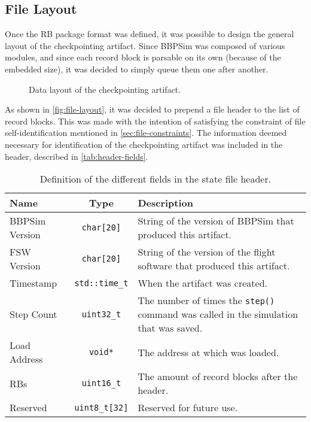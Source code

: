 {\subsection*{File Layout}
Once the RB package format was defined, it was possible to design the general layout of the checkpointing artifact. Since \gls{BBPSim} was composed of various modules, and since each record block is parsable on its own (because of the embedded size), it was decided to simply queue them one after another. 

\begin{figure}[h]
	\vspace{6pt}
	\centering
	\small
	
	\caption{Data layout of the checkpointing artifact.}
	\label{fig:file-layout}
\end{figure}

As shown in \autoref{fig:file-layout}, it was decided to prepend a file header to the list of record blocks. This was made with the intention of satisfying the constraint of file self-identification mentioned in \autoref{sec:file-constraints}. The information deemed necessary for identification of the checkpointing artifact was included in the header, described in \autoref{tab:header-fields}.
\begin{table}[h]
	\vspace{12pt}
	\centering
	\begin{tabularx}{\linewidth}{l c X}
		\toprule
		{\bfseries Name}&{\bfseries \Cpp Type}&{\bfseries Description}\\
		\midrule
		BBPSim Version & \texttt{char[20]} & String of the version of BBPSim that produced this artifact.\\
		\midrule
		FSW Version & \texttt{char[20]} & String of the version of the flight software that produced this artifact.\\
		\midrule
		Timestamp & \texttt{std::time_t} & When the artifact was created.\\
		\midrule
		Step Count & \texttt{uint32_t} & The number of times the \texttt{step()} command was called in the simulation that was saved.\\
		\midrule
		Load Address & \texttt{void*} & The address at which \pathmono{libBbpSim.so} was loaded.\\
		\midrule
		RBs & \texttt{uint16_t} & The amount of record blocks after the header.\\
		\midrule
		Reserved & \texttt{uint8_t[32]} & Reserved for future use.\\
		\bottomrule	
	\end{tabularx}
	\caption{Definition of the different fields in the state file header.}
	\label{tab:header-fields}
\end{table}

}
